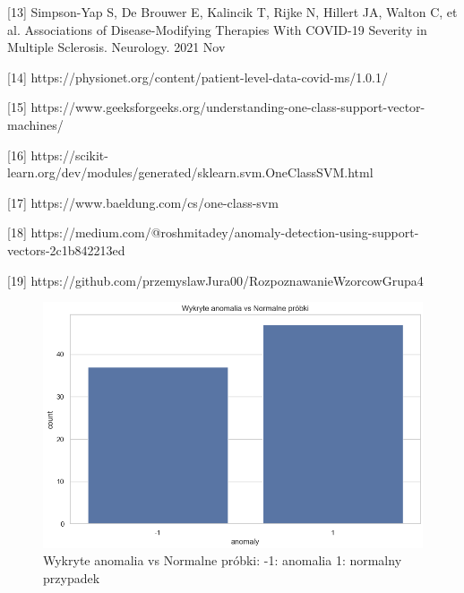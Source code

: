 \documentclass[a4paper,fleqn]{cas-dc}
\begin{document}
[13] Simpson-Yap S, De Brouwer E, Kalincik T, Rijke N, Hillert JA, Walton C, et al. Associations of Disease-Modifying Therapies With COVID-19 Severity in Multiple Sclerosis. 
Neurology. 2021 Nov

[14] https://physionet.org/content/patient-level-data-covid-ms/1.0.1/

[15] https://www.geeksforgeeks.org/understanding-one-class-support-vector-machines/

[16] https://scikit-learn.org/dev/modules/generated/sklearn.svm.OneClassSVM.html

[17] https://www.baeldung.com/cs/one-class-svm

[18] https://medium.com/@roshmitadey/anomaly-detection-using-support-vectors-2c1b842213ed

[19] https://github.com/przemyslawJura00/RozpoznawanieWzorcowGrupa4




\newpage
\newpage
\begin{figure}[h]
	\includegraphics[scale=.40]{wykresy/wykres1.png}
	\caption{Wykryte anomalia vs Normalne próbki: -1: anomalia 1: normalny przypadek}
	\label{FIG:1}
\end{figure}
\end{document}
